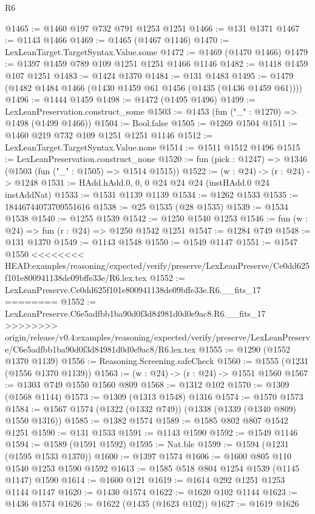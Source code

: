 \begin{lexlean}{R6}
\begin{coremodule}
{{{{{{{{{{{{{{{{{{{{{{{{{{{{{{{{{{{{{{{{{{{{{{{{{{{{{{{{{{{{{@1465 := @1460 @197 @732 @791 @1253 @1251
@1466 := @131 @1371
@1467 := @1143 @1466
@1469 := @1465 (@1467 @1146)
@1470 := LexLeanTarget.TargetSyntax.Value.some
@1472 := @1469 (@1470 @1466)
@1479 := @1397 @1459 @789 @109 @1251 @1251 @1466 @1146
@1482 := @1418 @1459 @107 @1251
@1483 := @1424 @1370
@1484 := @131 @1483
@1495 := @1479 (@1482 @1484 @1466 (@1430 @1459 @61 @1456 (@1435 (@1436 @1459 @61))))
@1496 := @1444 @1459
@1498 := @1472 (@1495 @1496)
@1499 := LexLeanPreservation.construct_some
@1503 := @1453 (fun ("_" : @1270) => @1498 (@1499 @1466))
@1504 := Bool.false
@1505 := @1269 @1504
@1511 := @1460 @219 @732 @109 @1251 @1251 @1146
@1512 := LexLeanTarget.TargetSyntax.Value.none
@1514 := @1511 @1512 @1496
@1515 := LexLeanPreservation.construct_none
@1520 := fun (pick : @1247) => @1346 (@1503 (fun ("_" : @1505) => @1514 @1515))
@1522 := (w : @24) -> (r : @24) -> @1248
@1531 := HAdd.hAdd.{0, 0, 0} @24 @24 @24 (instHAdd.{0} @24 instAddNat)
@1533 := @1531 @1139 @1139
@1534 := @1262 @1533
@1535 := 18446744073709551616
@1538 := @25 @1535 (@28 @1535)
@1539 := @1534 @1538
@1540 := @1255 @1539
@1542 := @1250 @1540 @1253
@1546 := fun (w : @24) => fun (r : @24) => @1250 @1542 @1251
@1547 := @1284 @749
@1548 := @131 @1370
@1549 := @1143 @1548
@1550 := @1549 @1147
@1551 := @1547 @1550
<<<<<<<< HEAD:examples/reasoning/expected/verify/preserve/LexLeanPreserve/Ce0dd625f101e800941138de09bffe33e/R6.lex.tex
@1552 := LexLeanPreserve.Ce0dd625f101e800941138de09bffe33e.R6.__fits_17
========
@1552 := LexLeanPreserve.C6e5adfbb1ba90d0f3d84981d0d0e9ac8.R6.__fits_17
>>>>>>>> origin/release/v0.4:examples/reasoning/expected/verify/preserve/LexLeanPreserve/C6e5adfbb1ba90d0f3d84981d0d0e9ac8/R6.lex.tex
@1555 := @1290 (@1552 @1370 @1139)
@1556 := Reasoning.Screening.safeCheck
@1560 := @1555 (@1231 (@1556 @1370 @1139))
@1563 := (w : @24) -> (r : @24) -> @1551 @1560
@1567 := @1303 @749 @1550 @1560 @809
@1568 := @1312 @102
@1570 := @1309 (@1568 @1144)
@1573 := @1309 (@1313 @1548) @1316
@1574 := @1570 @1573
@1584 := @1567 @1574 (@1322 (@1332 @749)) (@1338 (@1339 (@1340 @809) @1550 @1316))
@1585 := @1382 @1574
@1589 := @1585 @802 @807 @1542 @1251
@1590 := @131 @1533
@1591 := @1143 @1590
@1592 := @1549 @1146
@1594 := @1589 (@1591 @1592)
@1595 := Nat.ble
@1599 := @1594 (@1231 (@1595 @1533 @1370))
@1600 := @1397 @1574
@1606 := @1600 @805 @110 @1540 @1253 @1590 @1592
@1613 := @1585 @518 @804 @1254 @1539 (@1145 @1147) @1590
@1614 := @1600 @121
@1619 := @1614 @292 @1251 @1253 @1144 @1147
@1620 := @1430 @1574
@1622 := @1620 @102 @1144
@1623 := @1436 @1574
@1626 := @1622 (@1435 (@1623 @102))
@1627 := @1619 @1626
}}}}}}}}}}}}}}}}}}}}}}}}}}}}}}}}}}}}}}}}}}}}}}}}}}}}}}}}}}}}}
\end{coremodule}
\end{lexlean}
